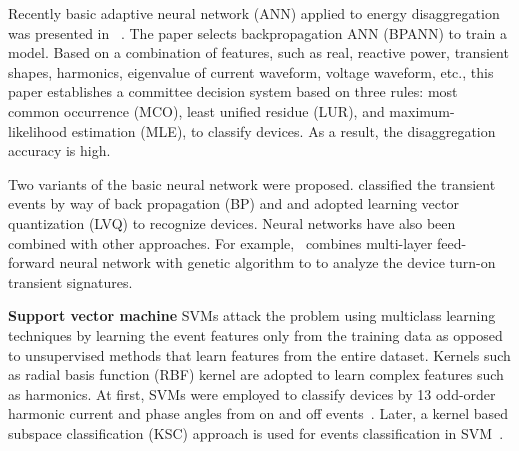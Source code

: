 Recently basic adaptive neural network (ANN) applied to energy disaggregation was presented in ~\cite{liang2010load}. 
The paper selects backpropagation ANN (BPANN) to
train a model. 
Based on a combination of features,
such as real, reactive power,
transient shapes, harmonics, eigenvalue of current waveform,
voltage waveform, etc., 
this paper establishes a committee decision system based on 
three rules: most common occurrence (MCO), least unified residue (LUR), and
maximum-likelihood estimation (MLE), to classify devices. 
As a result, the disaggregation accuracy is high. 

%


Two variants of the basic neural network 
were proposed. %
\cite{yang2007design} classified the transient events by way of
back propagation (BP) and 
and \cite{chang2008load} adopted learning vector quantization (LVQ) to
recognize devices. %
Neural networks have also been combined with other approaches. For example,~\cite{chang2010newmethod} combines multi-layer feed-forward neural network with genetic algorithm to 
to analyze the device turn-on transient signatures. 

\textbf{Support vector machine}
SVMs attack the problem using multiclass learning techniques by learning the
event features only from the training data as opposed to unsupervised methods that learn
features from the entire dataset. 
Kernels such as radial basis function (RBF) kernel are adopted to learn complex features such as harmonics. At first, SVMs were employed to classify devices by 13 odd-order harmonic current 
and phase angles from on and off events~\cite{onoda2000applying}. 
Later, a kernel based subspace classification (KSC) approach is used for 
events classification in SVM~\cite{onoda2000applying2}. 


